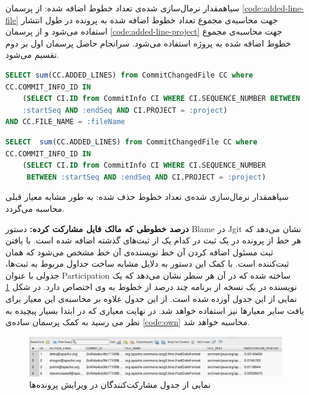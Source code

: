 ‌سیاه{‫مقدار نرمال‌سازی شده‌ی تعداد خطوط اضافه شده:‬}
از پرسمان \ref{code:added-line-file} جهت محاسبه‌ی مجموع تعداد خطوط اضافه شده به پرونده در طول انتشار استفاده می‌شود و از پرسمان \ref{code:added-line-project} جهت محاسبه‌ی مجموع خطوط اضافه شده به پروژه استفاده می‌شود. سرانجام حاصل پرسمان اول بر دوم تقسیم می‌شود. 

\begin{latin}
	\begin{lstlisting}[language=SQL]
SELECT sum(CC.ADDED_LINES) from CommitChangedFile CC where
CC.COMMIT_INFO_ID IN
	(SELECT CI.ID from CommitInfo CI WHERE CI.SEQUENCE_NUMBER BETWEEN 
	:startSeq AND :endSeq AND CI.PROJECT = :project)
AND CC.FILE_NAME = :fileName
	\end{lstlisting}
\end{latin}
\label{code:added-line-file}

\begin{latin}
\begin{lstlisting}[language=SQL]
SELECT  sum(CC.ADDED_LINES) from CommitChangedFile CC where 
CC.COMMIT_INFO_ID IN
	(SELECT CI.ID from CommitInfo CI WHERE CI.SEQUENCE_NUMBER
	 BETWEEN :startSeq AND :endSeq AND CI.PROJECT = :project)
\end{lstlisting}
\end{latin}
\label{code:added-line-project}

‌سیاه{‫مقدار نرمال‌سازی شده‌ی تعداد خطوط حذف شده:‬} به طور مشابه معیار قبلی محاسبه می‌گردد.

\textbf{درصد خطوطی که مالک فایل مشارکت کرده:}
دستور Blame در Jgit نشان می‌دهد که هر خط از پرونده در یک ثبت  در کدام یک از ثبت‌های گذشته اضافه شده است.  با یافتن ثبت مسئول اضافه کردن آن خط نویسنده‌ی آن خط مشخص می‌شود که همان ثبت‌کننده است. با کمک این دستور به دلایل مشابه ساخت جداول مربوط به ثبت‌ها، جدولی با عنوان Participation ساخته شده که در آن هر سطر نشان می‌دهد که یک نویسنده در یک نسخه از برنامه چند درصد از خطوط به وی اختصاص دارد. در شکل \ref{fig:participation} نمایی از این جدول آورده شده است.  از این جدول علاوه بر محاسبه‌ی این معیار برای یافت سایر معیارها نیز استفاده خواهد شد. در نهایت معیاری که در ابتدا بسیار پیچیده به نظر می رسید به کمک پرسمان ساده‌ی \ref{code:own} محاسبه خواهد شد. 

\begin{figure}[H]
	\centering
	\includegraphics[width=1\textwidth]{img/case_study/participation.png}
	\caption{نمایی از جدول مشارکت‌کنندگان در ویرایش پرونده‌ها}
	\label{fig:participation}
\end{figure}


